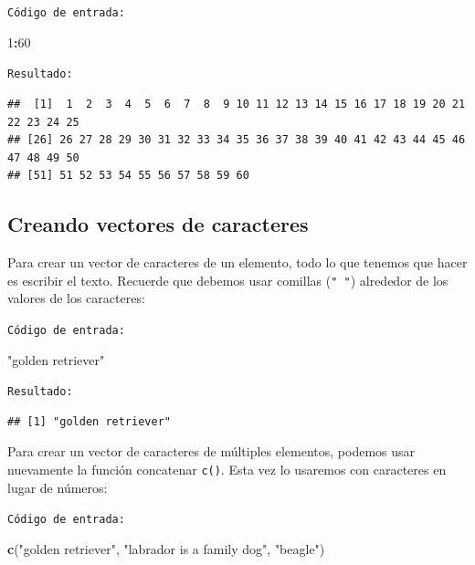 \documentclass[
]{book}
\newenvironment{Shaded}{\begin{snugshade}}{\end{snugshade}}
\newcommand{\DecValTok}[1]{\textcolor[rgb]{0.00,0.00,0.81}{#1}}
\newcommand{\KeywordTok}[1]{\textcolor[rgb]{0.13,0.29,0.53}{\textbf{#1}}}
\newcommand{\NormalTok}[1]{#1}
\newcommand{\OperatorTok}[1]{\textcolor[rgb]{0.81,0.36,0.00}{\textbf{#1}}}
\newcommand{\StringTok}[1]{\textcolor[rgb]{0.31,0.60,0.02}{#1}}
\begin{document}
\texttt{Código\ de\ entrada:}

\begin{Shaded}
\begin{Highlighting}[]
\DecValTok{1}\OperatorTok{:}\DecValTok{60}
\end{Highlighting}
\end{Shaded}

\texttt{Resultado:}

\begin{verbatim}
##  [1]  1  2  3  4  5  6  7  8  9 10 11 12 13 14 15 16 17 18 19 20 21 22 23 24 25
## [26] 26 27 28 29 30 31 32 33 34 35 36 37 38 39 40 41 42 43 44 45 46 47 48 49 50
## [51] 51 52 53 54 55 56 57 58 59 60
\end{verbatim}

\hypertarget{creando-vectores-de-caracteres}{%
\subsection{Creando vectores de caracteres}\label{creando-vectores-de-caracteres}}

Para crear un vector de caracteres de un elemento, todo lo que tenemos que hacer es escribir el texto. Recuerde que debemos usar comillas (\texttt{"\ "}) alrededor de los valores de los caracteres:

\texttt{Código\ de\ entrada:}

\begin{Shaded}
\begin{Highlighting}[]
\StringTok{"golden retriever"}
\end{Highlighting}
\end{Shaded}

\texttt{Resultado:}

\begin{verbatim}
## [1] "golden retriever"
\end{verbatim}

Para crear un vector de caracteres de múltiples elementos, podemos usar nuevamente la función concatenar \texttt{c()}. Esta vez lo usaremos con caracteres en lugar de números:

\texttt{Código\ de\ entrada:}

\begin{Shaded}
\begin{Highlighting}[]
\KeywordTok{c}\NormalTok{(}\StringTok{"golden retriever"}\NormalTok{, }\StringTok{"labrador is a family dog"}\NormalTok{, }\StringTok{"beagle"}\NormalTok{)}
\end{Highlighting}
\end{Shaded}
\end{document}
